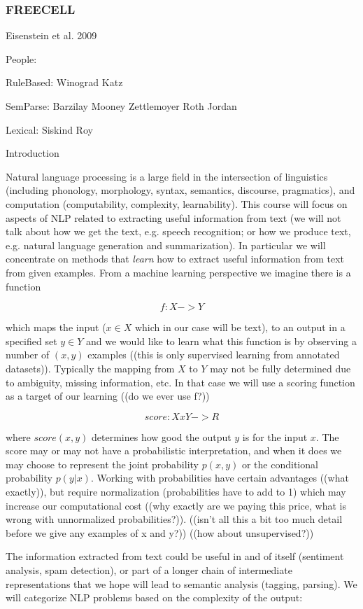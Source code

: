 \documentclass[ignorenonframetext]{beamer}
\begin{document}
\begin{frame}\frametitle{FREECELL}
Eisenstein et al. 2009
\end{frame}

People:

RuleBased:
Winograd
Katz

SemParse:
Barzilay
Mooney
Zettlemoyer
Roth
Jordan

Lexical:
Siskind
Roy

Introduction

Natural language processing is a large field in the intersection of
linguistics (including phonology, morphology, syntax, semantics,
discourse, pragmatics), and computation (computability, complexity,
learnability).  This course will focus on aspects of NLP related to
extracting useful information from text (we will not talk about how we
get the text, e.g. speech recognition; or how we produce text,
e.g. natural language generation and summarization).  In particular we
will concentrate on methods that {\em learn} how to extract useful
information from text from given examples.  From a machine learning
perspective we imagine there is a function 

\[ f: X -> Y \]

which maps the input ($x \in X$ which in our case will be text), to an
output in a specified set $y \in Y$ and we would like to learn what
this function is by observing a number of $(x, y)$ examples ((this is
only supervised learning from annotated datasets)).  Typically the
mapping from $X$ to $Y$ may not be fully determined due to ambiguity,
missing information, etc.  In that case we will use a scoring function
as a target of our learning ((do we ever use f?))

\[ score: X x Y -> R \]

where $score(x, y)$ determines how good the output $y$ is for the
input $x$.  The score may or may not have a probabilistic
interpretation, and when it does we may choose to represent the joint
probability $p(x, y)$ or the conditional probability $p(y|x)$.
Working with probabilities have certain advantages ((what exactly)),
but require normalization (probabilities have to add to 1) which may
increase our computational cost ((why exactly are we paying this
price, what is wrong with unnormalized probabilities?)).  ((isn't all
this a bit too much detail before we give any examples of x and y?))
((how about unsupervised?))

The information extracted from text could be useful in and of itself
(sentiment analysis, spam detection), or part of a longer chain of
intermediate representations that we hope will lead to semantic
analysis (tagging, parsing).  We will categorize NLP problems based on
the complexity of the output:
\end{document}
